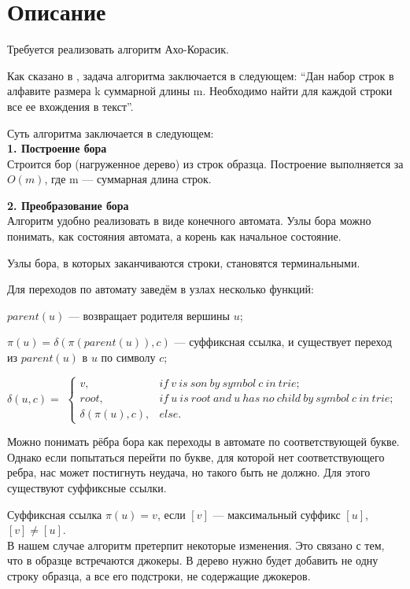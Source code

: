 \section{Описание}
Требуется реализовать алгоритм Ахо-Корасик. 

Как сказано в \cite{Aho-Kor-ifmo}, задача алгоритма заключается в следующем: \enquote{Дан набор строк в алфавите размера k суммарной длины m. Необходимо найти для каждой строки все ее вхождения в текст}. 

Суть алгоритма заключается в следующем: \\
\textbf{1. Построение бора}\\
Строится бор (нагруженное дерево) из строк образца. Построение выполняется за $O(m)$, где m --- суммарная длина строк.

\textbf{2. Преобразование бора}\\
Алгоритм удобно реализовать в виде конечного автомата. Узлы бора можно понимать, как состояния автомата, а корень как начальное состояние.

Узлы бора, в которых заканчиваются строки, становятся терминальными.

Для переходов по автомату заведём в узлах несколько функций:

$parent(u)$ --- возвращает родителя вершины $u$;

$\pi(u) = \delta(\pi(parent(u)), c)$ --- суффиксная ссылка, и существует переход из $parent(u)$ в $u$ по символу $c$;

$\delta(u, c) = $
$\begin{cases}
v, & if\ v\ is\ son\ by\ symbol\ c\ in\ trie;\\
root, & if\ u\ is\ root\ and\ u\ has\ no\ child\ by\ symbol\ c\ in\ trie;\\
\delta(\pi(u), c), & else.
\end{cases}$

Можно понимать рёбра бора как переходы в автомате по соответствующей букве. Однако если попытаться перейти по букве, для которой нет соответствующего ребра, нас может постигнуть неудача, но такого быть не должно. Для этого существуют суффиксные ссылки.

Суффиксная ссылка $\pi(u) = v$, если $[v]$ --- максимальный суффикс $[u]$, $[v] \neq [u]$.
\\
В нашем случае алгоритм претерпит некоторые изменения. Это связано с тем, что в образце встречаются джокеры. В дерево нужно будет добавить не одну строку образца, а все его подстроки, не содержащие джокеров.

